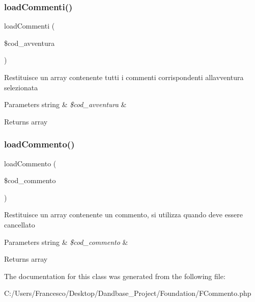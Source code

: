 \subsubsection{\texorpdfstring{load\+Commenti()}{loadCommenti()}}
{\footnotesize\ttfamily load\+Commenti (\begin{DoxyParamCaption}\item[{}]{\$cod\+\_\+avventura }\end{DoxyParamCaption})}

Restituisce un array contenente tutti i commenti corrispondenti all\textquotesingle{}avventura selezionata


\begin{DoxyParams}[1]{Parameters}
string & {\em \$cod\+\_\+avventura} & \\
\hline
\end{DoxyParams}
\begin{DoxyReturn}{Returns}
array 
\end{DoxyReturn}
\mbox{\label{class_f_commento_aad304f1e51e8522f6b69b74bffc35aec}} 
\subsubsection{\texorpdfstring{load\+Commento()}{loadCommento()}}
{\footnotesize\ttfamily load\+Commento (\begin{DoxyParamCaption}\item[{}]{\$cod\+\_\+commento }\end{DoxyParamCaption})}

Restituisce un array contenente un commento, si utilizza quando deve essere cancellato


\begin{DoxyParams}[1]{Parameters}
string & {\em \$cod\+\_\+commento} & \\
\hline
\end{DoxyParams}
\begin{DoxyReturn}{Returns}
array 
\end{DoxyReturn}


The documentation for this class was generated from the following file\+:\begin{DoxyCompactItemize}
\item 
C\+:/\+Users/\+Francesco/\+Desktop/\+Dandbase\+\_\+\+Project/\+Foundation/F\+Commento.\+php\end{DoxyCompactItemize}
